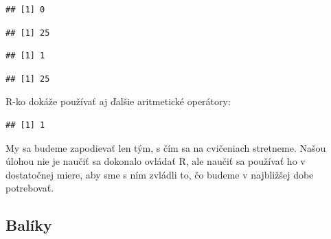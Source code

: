 \begin{verbatim}
## [1] 0
\end{verbatim}

\begin{Shaded}
\begin{Highlighting}[]
 \OperatorTok{*}\StringTok{ }
\end{Highlighting}
\end{Shaded}

\begin{verbatim}
## [1] 25
\end{verbatim}

\begin{Shaded}
\begin{Highlighting}[]
 \OperatorTok{/}\StringTok{ }
\end{Highlighting}
\end{Shaded}

\begin{verbatim}
## [1] 1
\end{verbatim}

\begin{Shaded}
\begin{Highlighting}[]
\OperatorTok{^}
\end{Highlighting}
\end{Shaded}

\begin{verbatim}
## [1] 25
\end{verbatim}

R-ko dokáže používať aj ďalšie aritmetické operátory:

\begin{Shaded}
\end{Shaded}

\begin{verbatim}
## [1] 1
\end{verbatim}

My sa budeme zapodievať len tým, s čím sa na cvičeniach stretneme. Našou
úlohou nie je naučiť sa dokonalo ovládať R, ale naučiť sa používať ho v
dostatočnej miere, aby sme s ním zvládli to, čo budeme v najbližšej dobe
potrebovať.

\hypertarget{baluxedky}{%
\subsection{Balíky}\label{baluxedky}}


